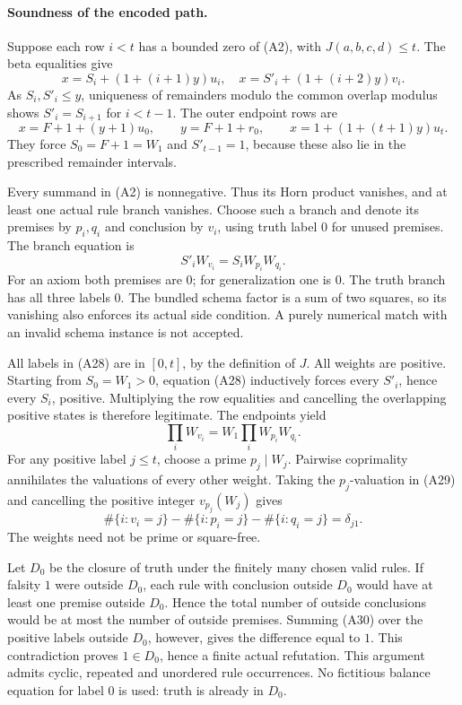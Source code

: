 \paragraph{Soundness of the encoded path.}
Suppose each row \(i<t\) has a bounded zero of (A2), with
\(J(a,b,c,d)\le t\).  The beta equalities give
\[
 x=S_i+(1+(i+1)y)u_i,\quad
 x=S'_i+(1+(i+2)y)v_i.
\]
As \(S_i,S'_i\le y\), uniqueness of remainders modulo the common
overlap modulus shows \(S'_i=S_{i+1}\) for \(i<t-1\).
The outer endpoint rows are
\[
 x=F+1+(y+1)u_0,\qquad y=F+1+r_0,\qquad
 x=1+(1+(t+1)y)u_t.                                    \tag{A27}
\]
They force \(S_0=F+1=W_1\) and \(S'_{t-1}=1\), because these
also lie in the prescribed remainder intervals.

Every summand in (A2) is nonnegative.  Thus its Horn product vanishes,
and at least one actual rule branch vanishes.  Choose such a branch
and denote its premises by \(p_i,q_i\) and conclusion by \(v_i\),
using truth label \(0\) for unused premises.  The branch equation is
\[
 S'_i W_{v_i}=S_iW_{p_i}W_{q_i}.                        \tag{A28}
\]
For an axiom both premises are \(0\); for generalization one is \(0\).
The truth branch has all three labels \(0\).
The bundled schema factor is a sum of two squares, so its vanishing
also enforces its actual side condition.  A purely numerical match
with an invalid schema instance is not accepted.

All labels in (A28) are in \([0,t]\), by the definition of \(J\).
All weights are positive.  Starting from \(S_0=W_1>0\), equation (A28)
inductively forces every \(S'_i\), hence every \(S_i\), positive.
Multiplying the row equalities and cancelling the overlapping positive
states is therefore legitimate.  The endpoints yield
\[
 \prod_i W_{v_i}=W_1\prod_iW_{p_i}W_{q_i}.               \tag{A29}
\]
For any positive label \(j\le t\), choose a prime \(p_j\mid W_j\).
Pairwise coprimality annihilates the valuations of every other weight.
Taking the \(p_j\)-valuation in (A29) and cancelling the positive integer
\(v_{p_j}(W_j)\) gives
\[
 \#\{i:v_i=j\}
 -\#\{i:p_i=j\}-\#\{i:q_i=j\}=\delta_{j1}.              \tag{A30}
\]
The weights need not be prime or square-free.

Let \(D_0\) be the closure of truth under the finitely many chosen valid
rules.  If falsity \(1\) were outside \(D_0\), each rule with conclusion
outside \(D_0\) would have at least one premise outside \(D_0\).
Hence the total number of outside conclusions would be at most the
number of outside premises.  Summing (A30) over the positive labels
outside \(D_0\), however, gives the difference equal to \(1\).
This contradiction proves \(1\in D_0\), hence a finite actual
refutation.  This argument admits cyclic, repeated and unordered rule
occurrences.  No fictitious balance equation for label \(0\) is used:
truth is already in \(D_0\).

